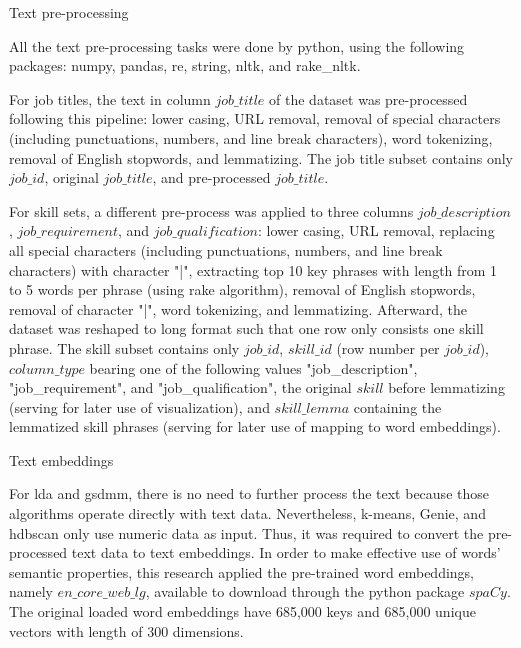 \documentclass[a4paper,man,floatsintext,natbib,noextraspace]{apa6}
\makeatletter
\renewcommand{\subsection}{\@startsection{subsection}{2}
  {\z@}
  {\b@level@two@skip}
  {\e@level@two@skip}
  {\normalfont\normalsize\bfseries}}
\makeatother
\begin{document}
\subsection{Text pre-processing}

All the text pre-processing tasks were done by python, using the following packages: numpy, pandas, re, string, nltk, and rake\_nltk.

For job titles, the text in column $job\_title$ of the dataset was pre-processed following this pipeline: lower casing, URL removal, removal of special characters (including punctuations, numbers, and line break characters), word tokenizing, removal of English stopwords, and lemmatizing. The job title subset contains only $job\_id$, original $job\_title$, and pre-processed $job\_title$.

For skill sets, a different pre-process was applied to three columns $job\_description$, $job\_requirement$, and $job\_qualification$: lower casing, URL removal, replacing all special characters (including punctuations, numbers, and line break characters) with character "|", extracting top 10 key phrases with length from 1 to 5 words per phrase (using \gls{rake} algorithm), removal of English stopwords, removal of character "|", word tokenizing, and lemmatizing. Afterward, the dataset was reshaped to long format such that one row only consists one skill phrase. The skill subset contains only $job\_id$, $skill\_id$ (row number per $job\_id$), $column\_type$ bearing one of the following values "job\_description", "job\_requirement", and "job\_qualification", the original $skill$ before lemmatizing (serving for later use of visualization), and $skill\_lemma$ containing the lemmatized skill phrases (serving for later use of mapping to word embeddings).

\subsection{Text embeddings}

For \gls{lda} and \gls{gsdmm}, there is no need to further process the text because those algorithms operate directly with text data. Nevertheless, k-means, Genie, and \gls{hdbscan} only use numeric data as input. Thus, it was required to convert the pre-processed text data to text embeddings. In order to make effective use of words' semantic properties, this research applied the pre-trained word embeddings, namely $en\_core\_web\_lg$, available to download through the python package $spaCy$. The original loaded word embeddings have 685,000 keys and 685,000 unique vectors with length of 300 dimensions. 
\end{document}

